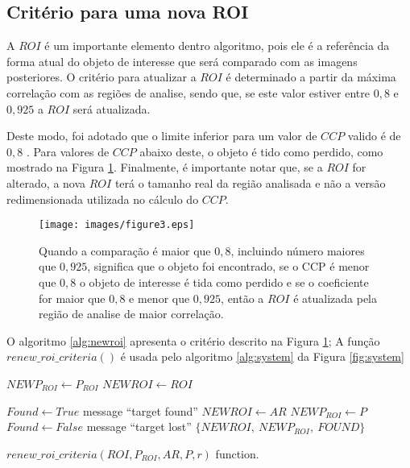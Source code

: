 


\subsection{Critério para uma nova ROI}

A $ROI$ é um importante elemento dentro algoritmo, pois ele é a referência da
forma atual do objeto de interesse que será comparado com as imagens posteriores.
O critério para atualizar a $ROI$ é determinado a partir da máxima correlação 
com as regiões de analise, sendo que, se este valor estiver entre $0,8$ 
e $0,925$ a $ROI$ será atualizada.

Deste modo, foi adotado que o limite inferior para um valor de $CCP$ valido é de $0,8$ \cite{Eugene}. Para valores
de $CCP$ abaixo deste, o objeto é tido como perdido, como mostrado na Figura
\ref{fig:newroicri}.
Finalmente, é importante notar que, se a $ROI$ for alterado, a nova $ROI$ terá 
o tamanho real da região analisada e não a versão redimensionada utilizada no cálculo do $CCP$.


\begin{figure}[H]
\texttt{[image: images/figure3.eps]}
\caption{Quando a comparação é maior que $0,8$, incluindo número maiores que $0,925$, 
significa que o objeto foi encontrado,
se o CCP é menor que $0,8$ o objeto de interesse é tida como perdido e se o coeficiente for maior que $0,8$ 
e menor que $0,925$, então a $ROI$ é atualizada pela região de analise de 
maior correlação.}
\label{fig:newroicri}
\end{figure}

O algoritmo \ref{alg:newroi} apresenta o critério descrito na Figura \ref{fig:newroicri};
A função $renew\_roi\_criteria()$ é usada pelo algoritmo \ref{alg:system} da Figura \ref{fig:system}
\begin{algorithm}

    $NEWP_{ROI} \leftarrow  P_{ROI}$ \;
    $NEWROI \leftarrow  ROI$ \;
    
    {
      $Found \leftarrow True$\;
        message ``target found''\;
        {
            $NEWROI \leftarrow  AR$\;
            $NEWP_{ROI} \leftarrow  P$\;
        }
    }
    {
      $Found \leftarrow False$\;
      message ``target lost''\;
    }
\Return  $\{NEWROI,~NEWP_{ROI},~FOUND\}$\;
\label{alg:newroi}
\caption{$renew\_roi\_criteria(ROI,P_{ROI},AR,P,r)$ function.}
\end{algorithm}
